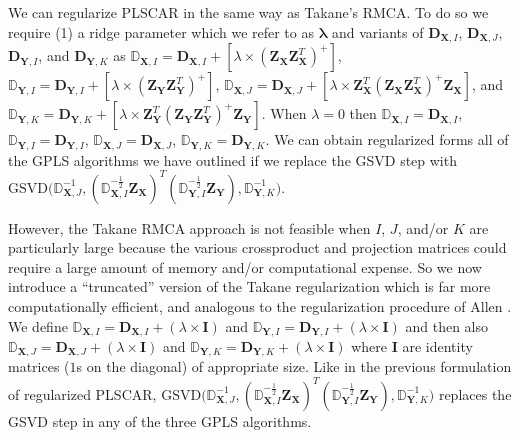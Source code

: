 \documentclass[12pt]{article}
\begin{document}
We can regularize PLSCAR in the same way as Takane's RMCA. To do so we
require (1) a ridge parameter which we refer to as
\(\boldsymbol \lambda\) and variants of \({\mathbf D}_{{\mathbf X},I}\),
\({\mathbf D}_{{\mathbf X},J}\), \({\mathbf D}_{{\mathbf Y},I}\), and
\({\mathbf D}_{{\mathbf Y},K}\) as
\({\mathbb D}_{{\mathbf X},I} = {\mathbf D}_{{\mathbf X},I} + [\lambda \times ({\mathbf Z}_{\mathbf X}{\mathbf Z}_{\mathbf X}^{T})^{+}]\),
\({\mathbb D}_{{\mathbf Y},I} = {\mathbf D}_{{\mathbf Y},I} + [\lambda \times ({\mathbf Z}_{\mathbf Y}{\mathbf Z}_{\mathbf Y}^{T})^{+}]\),
\({\mathbb D}_{{\mathbf X},J} = {\mathbf D}_{{\mathbf X},J} + [\lambda \times {\mathbf Z}_{\mathbf X}^{T}({\mathbf Z}_{\mathbf X}{\mathbf Z}_{\mathbf X}^{T})^{+}{\mathbf Z}_{\mathbf X}]\),
and
\({\mathbb D}_{{\mathbf Y},K} = {\mathbf D}_{{\mathbf Y},K} + [\lambda \times {\mathbf Z}_{\mathbf Y}^{T}({\mathbf Z}_{\mathbf Y}{\mathbf Z}_{\mathbf Y}^{T})^{+}{\mathbf Z}_{\mathbf Y}]\).
When \(\lambda = 0\) then
\({\mathbb D}_{{\mathbf X},I} = {\mathbf D}_{{\mathbf X},I}\),
\({\mathbb D}_{{\mathbf Y},I} = {\mathbf D}_{{\mathbf Y},I}\),
\({\mathbb D}_{{\mathbf X},J} = {\mathbf D}_{{\mathbf X},J}\),
\({\mathbb D}_{{\mathbf Y},K} = {\mathbf D}_{{\mathbf Y},K}\). We can
obtain regularized forms all of the GPLS algorithms we have outlined if
we replace the GSVD step with
\(\mathrm{GSVD(}{\mathbb D}_{{\mathbf X},J}^{-1}, ({\mathbb D}_{{\mathbf X},I}^{-\frac{1}{2}} {\mathbf Z}_{\mathbf X})^{T}({\mathbb D}_{{\mathbf Y},I}^{-\frac{1}{2}} {\mathbf Z}_{\mathbf Y}), {\mathbb D}_{{\mathbf Y},K}^{-1} \mathrm{)}\).

However, the Takane RMCA approach is not feasible when \(I\), \(J\),
and/or \(K\) are particularly large because the various crossproduct and
projection matrices could require a large amount of memory and/or
computational expense. So we now introduce a ``truncated'' version of
the Takane regularization which is far more computationally efficient,
and analogous to the regularization procedure of Allen
\citep{allen_sparse_2013, allen_generalized_2014}. We define
\({\mathbb D}_{{\mathbf X},I} = {\mathbf D}_{{\mathbf X},I} + (\lambda \times {\mathbf I})\)
and
\({\mathbb D}_{{\mathbf Y},I} = {\mathbf D}_{{\mathbf Y},I} + (\lambda \times {\mathbf I})\)
and then also
\({\mathbb D}_{{\mathbf X},J} = {\mathbf D}_{{\mathbf X},J} + (\lambda \times {\mathbf I})\)
and
\({\mathbb D}_{{\mathbf Y},K} = {\mathbf D}_{{\mathbf Y},K} + (\lambda \times {\mathbf I})\)
where \({\mathbf I}\) are identity matrices (\(1\)s on the diagonal) of
appropriate size. Like in the previous formulation of regularized
PLSCAR,
\(\mathrm{GSVD(}{\mathbb D}_{{\mathbf X},J}^{-1}, ({\mathbb D}_{{\mathbf X},I}^{-\frac{1}{2}} {\mathbf Z}_{\mathbf X})^{T}({\mathbb D}_{{\mathbf Y},I}^{-\frac{1}{2}} {\mathbf Z}_{\mathbf Y}), {\mathbb D}_{{\mathbf Y},K}^{-1} \mathrm{)}\)
replaces the GSVD step in any of the three GPLS algorithms.
\end{document}

